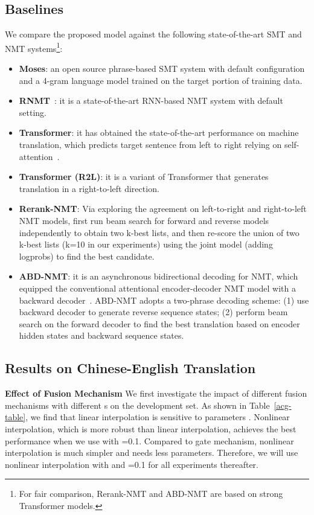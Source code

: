 \documentclass[11pt,a4paper]{article}
\begin{document}
\begin{CJK*}{UTF8}{gbsn}
\subsection{Baselines}

We compare the proposed model against the following state-of-the-art SMT and NMT systems{\footnote[10]{For fair comparison, Rerank-NMT and ABD-NMT are based on strong Transformer models.}}:

\begin{itemize}
	\item \textbf{Moses}: an open source phrase-based SMT system with default configuration and a 4-gram language model trained on the target portion of training data.
	\item \textbf{RNMT}~\cite{Luong:2015A}: it is a  state-of-the-art RNN-based NMT system with default setting.
	\item \textbf{Transformer}: it has obtained the state-of-the-art performance on machine translation, which predicts target sentence from left to right relying on self-attention~\cite{vaswani2017attention}.
	\item \textbf{Transformer (R2L)}: it is a variant of Transformer that generates translation in a right-to-left direction.
	\item \textbf{Rerank-NMT}: Via exploring the agreement on left-to-right and right-to-left NMT models, \cite{liu2016agreementa,W16-2323} first run beam search for forward and reverse models independently to obtain two k-best lists, and then re-score the union of two k-best lists (k=10 in our experiments) using the joint model (adding logprobs) to find the best candidate.
\item \textbf{ABD-NMT}: it is an asynchronous bidirectional decoding for NMT, which equipped the conventional attentional encoder-decoder NMT model with a backward decoder~\cite{zhang2018asynchronous}.
	ABD-NMT adopts a two-phrase decoding scheme: (1) use backward decoder to generate reverse sequence states; (2) perform beam search on the forward decoder to find the best translation based on encoder hidden states and backward sequence states.
\end{itemize}


\subsection{Results on Chinese-English Translation}

\textbf{Effect of Fusion Mechanism}
We first investigate the impact of different fusion mechanisms with different s on the development set.
As shown in Table~\ref{acg-table}, we find that linear interpolation is sensitive to parameters .
Nonlinear interpolation, which is more robust than linear interpolation, achieves the best performance when we use  with =0.1. Compared to gate mechanism, nonlinear interpolation is much simpler and needs less parameters. Therefore, we will use nonlinear interpolation with   and =0.1 for all experiments thereafter.



\end{CJK*}
\end{document}
